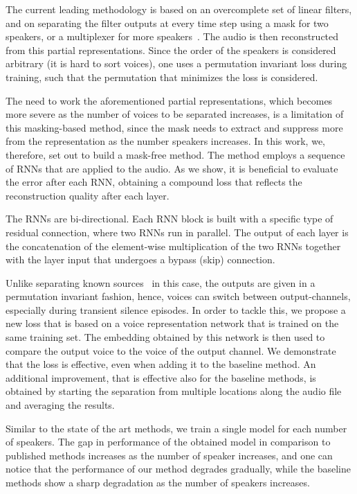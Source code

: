 \documentclass{article}
\begin{document}
The current leading methodology is based on an overcomplete set of linear filters, and on separating the filter outputs at every time step using a mask for two speakers, or a multiplexer for more speakers~\cite{luo2018tasnet,luo2019conv,zhang2020furcanext}. The audio is then reconstructed from this partial representations. Since the order of the speakers is considered arbitrary (it is hard to sort voices), one uses a permutation invariant loss during training, such that the permutation that minimizes the loss is considered. 

The need to work the aforementioned partial representations, which becomes more severe as the number of voices to be separated increases, is a limitation of this masking-based method, since the mask needs to extract and suppress more from the representation as the number speakers increases. In this work, we, therefore, set out to build a mask-free method. The method employs a sequence of RNNs that are applied to the audio. As we show, it is beneficial to evaluate the error after each RNN, obtaining a compound loss that reflects the reconstruction quality after each layer. 

The RNNs are bi-directional. Each RNN block is built with a specific type of residual connection, where two RNNs run in parallel. The output of each layer is the concatenation of the element-wise multiplication of the two RNNs together with the layer input that undergoes a bypass (skip) connection. 

Unlike separating known sources~\cite{defossez2019music} in this case, the outputs are given in a permutation invariant fashion, hence, voices can switch between output-channels, especially during transient silence episodes. In order to tackle this, we propose a new loss that is based on a voice representation network that is trained on the same training set. The embedding obtained by this network is then used to compare the output voice to the voice of the output channel. We demonstrate that the loss is effective, even when adding it to the baseline method. An additional improvement, that is effective also for the baseline methods, is obtained by starting the separation from multiple locations along the audio file and averaging the results. 

Similar to the state of the art methods, we train a single model for each number of speakers. The gap in performance of the obtained model in comparison to published methods increases as the number of speaker increases, and one can notice that the performance of our method degrades gradually, while the baseline methods show a sharp degradation as the number of speakers increases.
\end{document}
